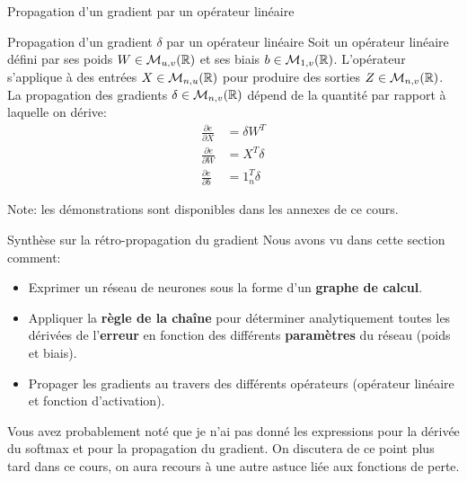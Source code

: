 \begin{frame}{Propagation d'un gradient par un opérateur linéaire}
	\begin{block}{Propagation d'un gradient $\delta$ par un opérateur linéaire}
		Soit un opérateur linéaire défini par ses poids $W \in \mathcal{M}_{u,v}(\mathbb{R})$ et ses biais $b \in \mathcal{M}_{1,v}(\mathbb{R})$. L'opérateur s'applique à des entrées $X \in \mathcal{M}_{n,u}(\mathbb{R})$ pour produire des sorties $Z \in \mathcal{M}_{n,v}(\mathbb{R})$. La propagation des gradients $\delta \in \mathcal{M}_{n,v}(\mathbb{R})$ dépend de la quantité par rapport à laquelle on dérive:
		\begin{equation*}
			\begin{aligned}
				\frac{\partial{e}}{\partial{X}} &= \delta W^T \\
				\frac{\partial{e}}{\partial{W}} &=  X^T \delta \\
				\frac{\partial{e}}{\partial{b}} &= 1_n^T \delta	
			\end{aligned}
		\end{equation*} 
	\end{block}
	Note: les démonstrations sont disponibles dans les annexes de ce cours.
\end{frame}

\begin{frame}{Synthèse sur la rétro-propagation du gradient}
	Nous avons vu dans cette section comment:
	\begin{itemize}
		\item Exprimer un réseau de neurones sous la forme d'un \textbf{graphe de calcul}.
		\item Appliquer la \textbf{règle de la chaîne} pour déterminer analytiquement toutes les dérivées de l'\textbf{erreur} en fonction des différents \textbf{paramètres} du réseau (poids et biais).
		\item Propager les gradients au travers des différents opérateurs (opérateur linéaire et fonction d'activation). 
	\end{itemize}
	\pause
	Vous avez probablement noté que je n'ai pas donné les expressions pour la dérivée du softmax et pour la propagation du gradient. On discutera de ce point plus tard dans ce cours, on aura recours à une autre astuce liée aux fonctions de perte.
\end{frame}